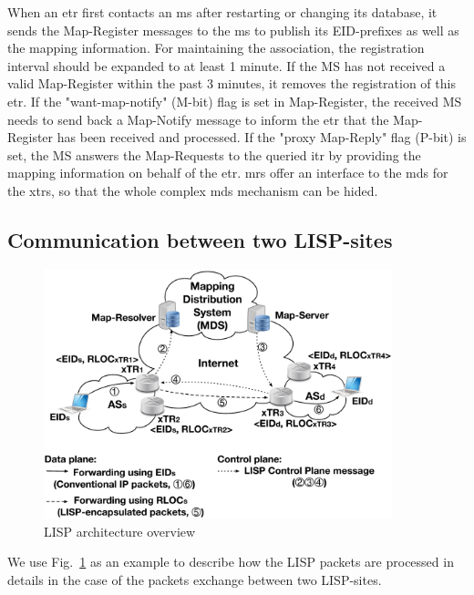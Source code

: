 When an \acrshort{etr} first contacts an \acrshort{ms} after restarting or changing its database, it sends the Map-Register messages to the \acrshort{ms} to publish its EID-prefixes as well as the mapping information. %
For maintaining the association, the registration interval should be expanded to at least 1 minute. If the MS has not received a valid Map-Register within the past 3 minutes, it removes the registration of this \acrshort{etr}. If the "want-map-notify" (M-bit) flag is set in Map-Register, the received MS needs to send back a Map-Notify message to inform the \acrshort{etr} that the Map-Register has been received and processed. If the "proxy Map-Reply" flag (P-bit) is set, the MS answers the Map-Requests to the queried \acrshort{itr} by providing the mapping information on behalf of the \acrshort{etr}. \acrshort{mr}s offer an interface to the \acrshort{mds} for the \acrshort{xtr}s, so that the whole complex \acrshort{mds} mechanism can be hided.


\subsection{Communication between two LISP-sites}
\label{sec:communication_2_lisp}
\begin{figure}[!t]
	\centering
	\includegraphics[width=0.9\textwidth]{Pics/LISP_D_C_planes.eps}
	\caption{LISP architecture overview}
	\label{LISP_archi}
\end{figure}
We use Fig.~\ref{LISP_archi} as an example to describe how the LISP packets are processed in details in the case of the packets exchange between two LISP-sites.

